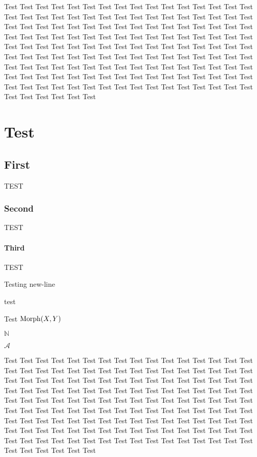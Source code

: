 \documentclass{book*}
\begin{document}
\tableofcontents

Test Test Test Test Test Test Test Test Test Test Test Test Test Test Test Test Test Test Test Test Test Test Test Test Test
Test Test Test Test Test Test Test Test Test Test Test Test Test Test Test Test Test Test Test Test Test Test Test Test Test
Test Test Test Test Test Test Test Test Test Test Test Test Test Test Test Test Test Test Test Test Test Test Test Test Test
Test Test Test Test Test Test Test Test Test Test Test Test Test Test Test Test Test Test Test Test Test Test Test Test Test
Test Test Test Test Test Test Test Test Test Test Test Test Test Test Test Test Test Test Test Test Test Test Test Test Test
Test Test Test Test Test Test Test Test Test Test Test Test Test Test Test Test Test Test Test Test Test Test Test Test Test

\chapter{Test}

\section{First}
TEST
\subsection{Second}
TEST
\subsubsection{Third}
TEST


\begin{thm}[Test]
Testing new-line

\begin{lem}[Test1]
test
\end{lem}

\end{thm}

\noindent Test $ \operatorname{Morph}(X,Y) $

$ \mathbb{N} $

$ \mathscr{A} $


\begin{exr}

    Test Test Test Test Test Test Test Test Test Test Test Test Test Test Test Test Test Test Test Test Test Test Test Test Test
    Test Test Test Test Test Test Test Test Test Test Test Test Test Test Test Test Test Test Test Test Test Test Test Test Test
    Test Test Test Test Test Test Test Test Test Test Test Test Test Test Test Test Test Test Test Test Test Test Test Test Test
    Test Test Test Test Test Test Test Test Test Test Test Test Test Test Test Test Test Test Test Test Test Test Test Test Test
    Test Test Test Test Test Test Test Test Test Test Test Test Test Test Test Test Test Test Test Test Test Test Test Test Test
    Test Test Test Test Test Test Test Test Test Test Test Test Test Test Test Test Test Test Test Test Test Test Test Test Test


\end{exr}
\end{document}
